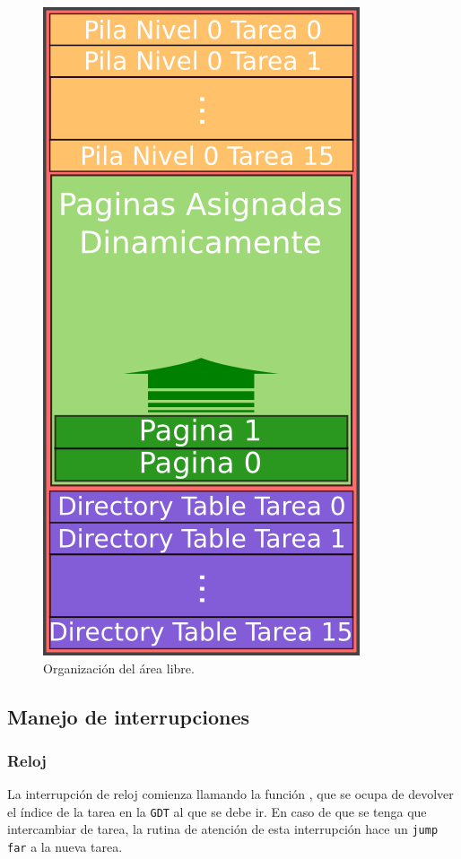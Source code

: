 \begin{figure}[H]
	\begin{center}
		\includegraphics[scale=0.45]{images/AreaLibre.png}
		\caption{Organización del área libre.}
		\label{fig:arealibre}
	\end{center}
\end{figure}

\subsection{Manejo de interrupciones}

\subsubsection{Reloj}

La interrupción de reloj comienza llamando la función , que se ocupa de devolver el índice de la tarea en la \texttt{GDT} al que se debe ir. En caso de que se tenga que intercambiar de tarea, la rutina de atención de esta interrupción hace un \texttt{jump far} a la nueva tarea.

